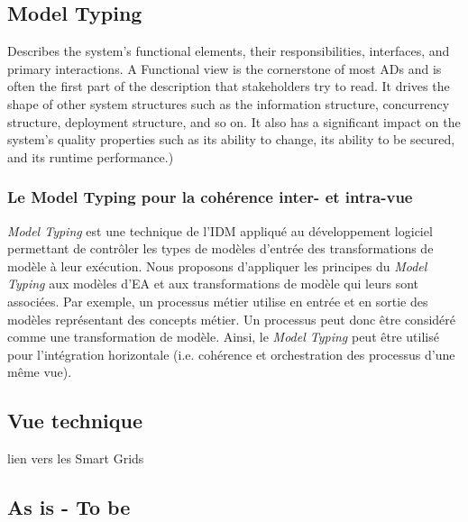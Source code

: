     \subsection{Model Typing}

 Describes the system’s functional elements, their responsibilities,
interfaces, and primary interactions. A Functional view is the cornerstone of
most ADs and is often the first part of the description that stakeholders try
to read. It drives the shape of other system structures such as the information
structure, concurrency structure, deployment structure, and so on. It also has a 
significant impact on the system’s quality properties such as its ability to
change, its ability to be secured, and its runtime performance.) 

\subsubsection{Le Model Typing pour la cohérence inter- et intra-vue}

\textit{Model Typing} est une technique de l'IDM appliqué au développement
logiciel permettant de contrôler les types de modèles d'entrée des
transformations de modèle à leur exécution. Nous proposons d'appliquer les
principes du \textit{Model Typing} aux modèles d'EA et aux transformations de
modèle qui leurs sont associées. Par exemple, un processus métier utilise en
entrée et en sortie des modèles représentant des concepts métier. Un processus
peut donc être considéré comme une transformation de modèle. Ainsi, le
\textit{Model Typing} peut être utilisé pour l'intégration horizontale (i.e.
cohérence et orchestration des processus d'une même vue).



    \subsection{Vue technique}
    lien vers les Smart Grids
    
    \subsection{As is - To be}

